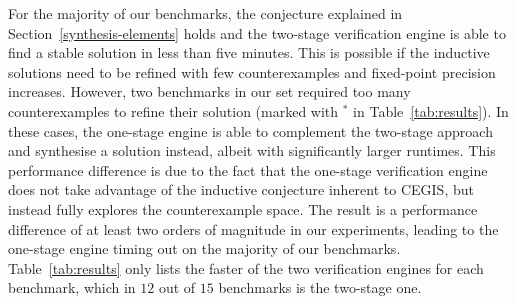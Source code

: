 \documentclass{sig-alternate-05-2015}
\begin{document}
For the majority of our benchmarks, the conjecture explained in
Section~\ref{synthesis-elements} holds and the two-stage verification 
engine %
is able to find a stable solution in less than five minutes.  This is possible if the
inductive solutions need to be refined with few counterexamples and
fixed-point precision increases.  However, two benchmarks in our set
required too many counterexamples to refine their solution (marked with $^*$
in Table~\ref{tab:results}).  In these cases, the one-stage engine 
is able to complement the two-stage approach and synthesise a solution
instead, albeit with significantly larger runtimes.  This performance
difference is due to the fact that the one-stage verification engine does
not take advantage of the inductive conjecture inherent to CEGIS, but
instead fully explores the counterexample space.  The result is a
performance difference of at least two orders of magnitude in our
experiments, leading to the one-stage engine timing out on the majority of
our benchmarks.  Table~\ref{tab:results} only lists the faster of the two
verification engines for each benchmark, which in $12$ out of $15$
benchmarks is the two-stage one.
\end{document}
